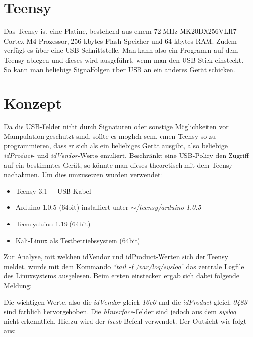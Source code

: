 \section{Teensy}
Das Teensy ist eine Platine, bestehend aus einem 72 MHz MK20DX256VLH7 Cortex-M4 Prozessor, 256 kbytes Flash Speicher und 64 kbytes RAM. Zudem verfügt es über eine USB-Schnittstelle. Man kann also ein Programm auf dem Teensy ablegen und dieses wird ausgeführt, wenn man den USB-Stick einsteckt. So kann man beliebige Signalfolgen über USB an ein anderes Gerät schicken.
			
\section{Konzept}
Da die USB-Felder nicht durch Signaturen oder sonstige Möglichkeiten vor Manipulation geschützt sind, sollte es möglich sein, einen Teensy so zu programmieren, dass er sich als ein beliebiges Gerät ausgibt, also beliebige \textit{idProduct}- und \textit{idVendor}-Werte emuliert. Beschränkt eine USB-Policy den Zugriff auf ein bestimmtes Gerät, so könnte man dieses theoretisch mit dem Teensy nachahmen.
Um dies umzusetzen wurden verwendet:

\begin{itemize}
	\item Teensy 3.1 + USB-Kabel
	\item Arduino 1.0.5 (64bit) installiert unter \textit{$\sim$/teensy/arduino-1.0.5}
	\item Teensyduino 1.19 (64bit)
	\item Kali-Linux als Testbetriebssystem (64bit)
\end{itemize}

Zur Analyse, mit welchen idVendor und idProduct-Werten sich der Teensy meldet, wurde mit dem Kommando \textit{"`tail -f /var/log/syslog"'} das zentrale Logfile des Linuxsystems ausgelesen. Beim ersten einstecken ergab sich dabei folgende Meldung:

\lstset{language=log}


Die wichtigen Werte, also die \textit{idVendor} gleich \textit{16c0} und die \textit{idProduct} gleich \textit{0483} sind farblich hervorgehoben. Die \textit{bInterface}-Felder sind jedoch aus dem \textit{syslog} nicht erkenntlich. Hierzu wird der \textit{lsusb}-Befehl verwendet. Der Outsieht wie folgt aus:



